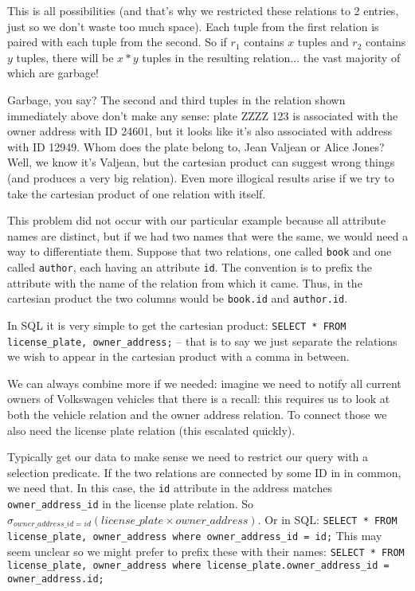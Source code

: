 This is all possibilities (and that's why we restricted these relations to 2 entries, just so we don't waste too much space). Each tuple from the first relation is paired with each tuple from the second. So if $r_{1}$ contains $x$ tuples and $r_{2}$ contains $y$ tuples, there will be $x*y$ tuples in the resulting relation... the vast majority of which are garbage! 

Garbage, you say? The second and third tuples in the relation shown immediately above don't make any sense: plate ZZZZ 123 is associated with the owner address with ID 24601, but it looks like it's also associated with address with ID 12949. Whom does the plate belong to, Jean Valjean or Alice Jones? Well, we know it's Valjean, but the cartesian product can suggest wrong things (and produces a very big relation). Even more illogical results arise if we try to take the cartesian product of one relation with itself.

This problem did not occur with our particular example because all attribute names are distinct, but if we had two names that were the same, we would need a way to differentiate them. Suppose that two relations, one called \texttt{book} and one called \texttt{author}, each having an attribute \texttt{id}. The convention is to prefix the attribute with the name of the relation from which it came. Thus, in the cartesian product the two columns would be \texttt{book.id} and \texttt{author.id}.

In SQL it is very simple to get the cartesian product: \texttt{SELECT * FROM license\_plate, owner\_address;} -- that is to say we just separate the relations we wish to appear in the cartesian product with a comma in between.

We can always combine more if we needed: imagine we need to notify all current owners of Volkswagen vehicles that there is a recall: this requires us to look at both the vehicle relation and the owner address relation. To connect those we also need the license plate relation (this escalated quickly).

Typically get our data to make sense we need to restrict our query with a selection predicate. If the two relations are connected by some ID in in common, we need that. In this case, the \texttt{id} attribute in the address matches \texttt{owner\_address\_id} in the license plate relation. So $\sigma_{owner\_address\_id = id}( license\_plate \times owner\_address )$. Or in SQL: \texttt{SELECT * FROM license\_plate, owner\_address where owner\_address\_id = id;} This may seem unclear so we might prefer to prefix these with their names: \texttt{SELECT * FROM license\_plate, owner\_address where license\_plate.owner\_address\_id = owner\_address.id;} 

